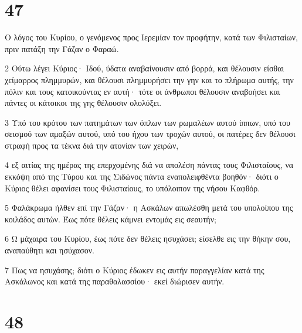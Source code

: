 \chapter{47}

\par Ο λόγος του Κυρίου, ο γενόμενος προς Ιερεμίαν τον προφήτην, κατά των Φιλισταίων, πριν πατάξη την Γάζαν ο Φαραώ.
\par 2 Ούτω λέγει Κύριος· Ιδού, ύδατα αναβαίνουσιν από βορρά, και θέλουσιν είσθαι χείμαρρος πλημμυρών, και θέλουσι πλημμυρήσει την γην και το πλήρωμα αυτής, την πόλιν και τους κατοικούντας εν αυτή· τότε οι άνθρωποι θέλουσιν αναβοήσει και πάντες οι κάτοικοι της γης θέλουσιν ολολύξει.
\par 3 Υπό του κρότου των πατημάτων των όπλων των ρωμαλέων αυτού ίππων, υπό του σεισμού των αμαξών αυτού, υπό του ήχου των τροχών αυτού, οι πατέρες δεν θέλουσι στραφή προς τα τέκνα διά την ατονίαν των χειρών,
\par 4 εξ αιτίας της ημέρας της επερχομένης διά να απολέση πάντας τους Φιλισταίους, να εκκόψη από της Τύρου και της Σιδώνος πάντα εναπολειφθέντα βοηθόν· διότι ο Κύριος θέλει αφανίσει τους Φιλισταίους, το υπόλοιπον της νήσου Καφθόρ.
\par 5 Φαλάκρωμα ήλθεν επί την Γάζαν· η Ασκάλων απωλέσθη μετά του υπολοίπου της κοιλάδος αυτών. Έως πότε θέλεις κάμνει εντομάς εις σεαυτήν;
\par 6 Ω μάχαιρα του Κυρίου, έως πότε δεν θέλεις ησυχάσει; είσελθε εις την θήκην σου, αναπαύθητι και ησύχασον.
\par 7 Πως να ησυχάσης; διότι ο Κύριος έδωκεν εις αυτήν παραγγελίαν κατά της Ασκάλωνος και κατά της παραθαλασσίου· εκεί διώρισεν αυτήν.

\chapter{48}

